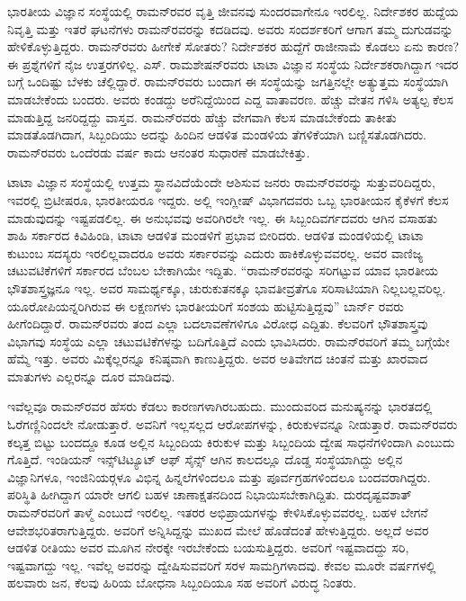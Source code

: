 ಭಾರತೀಯ ವಿಜ್ಞಾನ ಸಂಸ್ಥೆಯಲ್ಲಿ ರಾಮನ್‍ರವರ ವೃತ್ತಿ ಜೀವನವು ಸುಂದರವಾಗೇನೂ ಇರಲಿಲ್ಲ. ನಿರ್ದೇಶಕರ ಹುದ್ದೆಯ ನಿವೃತ್ತಿ ಮತ್ತು ಇತರೆ ಘಟನೆಗಳು ರಾಮನ್‍ರವರನ್ನು ಕದಡಿದವು. ಅವರು ಸಂದರ್ಶಕರಿಗೆ ಆಗಾಗ ತಮ್ಮ ದುಗುಡವನ್ನು ಹೇಳಿಕೊಳ್ಳುತ್ತಿದ್ದರು. ರಾಮನ್‍ರವರು ಹೀಗೇಕೆ ಸೋತರು? ನಿರ್ದೇಶಕರ ಹುದ್ದೆಗೆ ರಾಜೀನಾಮೆ ಕೊಡಲು ಏನು ಕಾರಣ? ಈ ಪ್ರಶ್ನೆಗಳಿಗೆ ನೈಜ ಉತ್ತರಗಳಿಲ್ಲ. ಎಸ್. ರಾಮಶೇಷನ್‍ರವರು ಟಾಟಾ ವಿಜ್ಞಾನ ಸಂಸ್ಥೆಯ ನಿರ್ದೇಶಕರಾಗಿದ್ದಾಗ ಇದರ ಬಗ್ಗೆ ಒಂದಿಷ್ಟು ಬೆಳಕು ಚೆಲ್ಲಿದ್ದಾರೆ. ರಾಮನ್‍ರವರು ಬಂದಾಗ ಈ ಸಂಸ್ಥೆಯನ್ನು ಜಗತ್ತಿನಲ್ಲೇ ಅತ್ಯುತ್ತಮ ಸಂಸ್ಥೆಯಾಗಿ ಮಾಡಬೇಕೆಂದು ಬಂದರು. ಅವರು ಕಂಡದ್ದು ಅರೆನಿದ್ದೆಯಿಂದ ಎದ್ದ ವಾತಾವರಣ. ಹೆಚ್ಚು ವೇತನ ಗಳಿಸಿ ಅತ್ಯಲ್ಪ ಕೆಲಸ ಮಾಡುತ್ತಿದ್ದ ಜನರಿದ್ದದ್ದು ವಾಸ್ತವ. ರಾಮನ್‍ರವರು ಹೆಚ್ಚು ವೇಗವಾಗಿ ಕೆಲಸ ಮಾಡಬೇಕೆಂದು ತಾಕೀತು ಮಾಡತೊಡಗಿದಾಗ, ಸಿಬ್ಬಂದಿಯು ಅದನ್ನು ಹಿಂದಿನ ಆಡಳಿತ ಮಂಡಳಿಯ ತೆಗಳಿಕೆಯಾಗಿ ಬಣ್ಣಿಸತೊಡಗಿದರು. ರಾಮನ್‍ರವರು ಒಂದೆರಡು ವರ್ಷ ಕಾದು ಆನಂತರ ಸುಧಾರಣೆ ಮಾಡಬೇಕಿತ್ತು.

ಟಾಟಾ ವಿಜ್ಞಾನ ಸಂಸ್ಥೆಯಲ್ಲಿ ಉತ್ತಮ ಸ್ಥಾನವಿದೆಯೆಂದೇ ಆಶಿಸುವ ಜನರು ರಾಮನ್‍ರವರನ್ನು ಸುತ್ತುವರಿದಿದ್ದರು, ಇವರಲ್ಲಿ ಬ್ರಿಟೀಷರೂ, ಭಾರತೀಯರೂ ಇದ್ದರು. ಅಲ್ಲಿ ಇಂಗ್ಲೀಷ್ ವಿಭಾಗದವರು ಒಬ್ಬ ಭಾರತೀಯನ ಕೈಕೆಳಗೆ ಕೆಲಸ ಮಾಡುವುದನ್ನು ಇಷ್ಟಪಡಲಿಲ್ಲ. ಈ ಅನುಭವವು ಅವರಿಗಿರಲೇ ಇಲ್ಲ. ಈ ಸಿಬ್ಬಂದಿವರ್ಗದವರು ಆಗಿನ ವಸಾಹತು ಶಾಹಿ ಸರ್ಕಾರದ ಕಿವಿಹಿಂಡಿ, ಟಾಟಾ ಆಡಳಿತ ಮಂಡಳಿಗೆ ಪ್ರಭಾವ ಬೀರಿದರು. ಆಡಳಿತ ಮಂಡಳಿಯಲ್ಲಿ ಟಾಟಾ ಕುಟುಂಬ ಸದಸ್ಯರು ಇರಲಿಲ್ಲವಾದರೂ ಅವರು ಸರ್ಕಾರವನ್ನು ಎದುರು ಹಾಕಿಕೊಳ್ಳುವವರಲ್ಲ. ಅವರ ವಾಣಿಜ್ಯ ಚಟುವಟಿಕೆಗಳಿಗೆ ಸರ್ಕಾರದ ಬೆಂಬಲ ಬೇಕಾಗಿಯೇ ಇದ್ದಿತು. “ರಾಮನ್‍ರವರನ್ನು ಸರಿಗಟ್ಟುವ ಯಾವ ಭಾರತೀಯ ಭೌತಶಾಸ್ತ್ರಜ್ಞನೂ ಇಲ್ಲ. ಅವರ ಸಾಮರ್ಥ್ಯಕ್ಕೂ, ಚುರುಕುತನಕ್ಕೂ ಭಾವತೀವ್ರತೆಗೂ ಸರಿಸಾಟಿಯಾಗಿ ನಿಲ್ಲಬಲ್ಲವರಿಲ್ಲ. ಯೂರೋಪಿಯನ್ನರಿಗಿರುವ ಈ ಲಕ್ಷಣಗಳು ಭಾರತೀಯರಿಗೆ ಸಂಶಯ ಹುಟ್ಟಿಸುತ್ತಿದ್ದವು” \enginline{-} ಬಾರ್ನ್ ರವರು ಹೀಗೆಂದಿದ್ದಾರೆ. ರಾಮನ್‍ರವರು ತಂದ ಎಲ್ಲಾ ಬದಲಾವಣೆಗಳಿಗೂ ವಿರೋಧ ಎದ್ದಿತು. ಕೆಲವರಿಗೆ ಭೌತಶಾಸ್ತ್ರವು ವಿಭಾಗವು ಸಂಸ್ಥೆಯ ಎಲ್ಲಾ ಚಟುವಟಿಕೆಗಳನ್ನು ಬದಿಗೊತ್ತಿದೆ ಎಂದು ಭಾವಿಸಿದರು. ರಾಮನ್‍ರವರಿಗೆ ತಮ್ಮ ಬಗ್ಗೆಯೇ ಹೆಮ್ಮೆ ಇತ್ತು. ಅವರು ಮಿಕ್ಕೆಲ್ಲರನ್ನೂ ಕನಿಷ್ಠವಾಗಿ ಕಾಣುತ್ತಿದ್ದರು. ಅವರ ಅತಿವೇಗದ ಚಿಂತನೆ ಮತ್ತು ಖಾರವಾದ ಮಾತುಗಳು ಎಲ್ಲರನ್ನೂ ದೂರ ಮಾಡಿದವು.

ಇವೆಲ್ಲವೂ ರಾಮನ್‍ರವರ ಹೆಸರು ಕೆಡಲು ಕಾರಣಗಳಾಗಿರಬಹುದು. ಮುಂದುವರಿದ ಮನುಷ್ಯನನ್ನು ಭಾರತದಲ್ಲಿ ಓರೆಗಣ್ಣಿನಿಂದಲೇ ನೋಡುತ್ತಾರೆ. ಅವನಿಗೆ ಇಲ್ಲಸಲ್ಲದ ಆರೋಪಗಳನ್ನು, ಕಿರುಕುಳವನ್ನೂ ನೀಡುತ್ತಾರೆ. ರಾಮನ್‍ರವರು ಕಲ್ಕತ್ತ ಬಿಟ್ಟು ಬಂದದ್ದೂ ಕೂಡ ಅಲ್ಲಿನ ಸಿಬ್ಬಂದಿಯ ಕಿರುಕುಳ ಮತ್ತು ಸಿಬ್ಬಂದಿಯ ದ್ವೇಷ ಸಾಧನೆಗಳಿಂದಾಗಿ ಎಂಬುದು ಗೊತ್ತಿದೆ. ಇಂಡಿಯನ್ ಇನ್ಸ್‌ಟಿಟ್ಯೂಟ್ ಆಫ್ ಸೈನ್ಸ್ ಆಗಿನ ಕಾಲದಲ್ಲೂ ದೊಡ್ಡ ಸಂಸ್ಥೆಯಾಗಿದ್ದು ಅಲ್ಲಿನ ವಿಜ್ಞಾನಿಗಳೂ, ಇಂಜಿನಿಯರ್‍ಗಳೂ ವಿಭಿನ್ನ ಹಿನ್ನಲೆಗಳಿಂದಲೂ ಮತ್ತು ಪೂರ್ವಗ್ರಹಗಳಿಂದಲೂ ಬಂದವರಾಗಿದ್ದರು. ಪರಿಸ್ಥಿತಿ ಹೀಗಿದ್ದಾಗ ಯಾರೇ ಆಗಲಿ ಬಹಳ ಚಾಣಾಕ್ಷತನದಿಂದ ನಿಭಾಯಿಸಬೇಕಾಗಿದ್ದಿತು. ದುರದೃಷ್ಟವಶಾತ್ ರಾಮನ್‍ರವರಿಗೆ ತಾಳ್ಮೆ ಎಂಬುದೆ ಇರಲಿಲ್ಲ. ಇತರರ ಅಭಿಪ್ರಾಯಗಳನ್ನು ಕೇಳಿಸಿಕೊಳ್ಳುವವರಲ್ಲ. ಬಹಳ ಬೇಗನೆ ಆವೇಶಭರಿತರಾಗುತ್ತಿದ್ದರು. ಅವರಿಗೆ ಅನ್ನಿಸಿದ್ದನ್ನು ಮುಖದ ಮೇಲೆ ಹೊಡೆದಂತೆ ಹೇಳುತ್ತಿದ್ದರು. ಅಲ್ಲದೆ ಅವರ ಆಡಳಿತ ರೀತಿಯು ಅವರ ಮೂಗಿನ ನೇರಕ್ಕೇ ಇರಬೇಕೆಂದು ಬಯಸುತ್ತಿದ್ದರು. ಅವರಿಗೆ ಇಷ್ಟವಾದದ್ದು ಸರಿ, ಇಷ್ಟವಾಗದ್ದು ಇಲ್ಲ. ಇವೆಲ್ಲ ಅವರನ್ನು ದ್ವೇಷಿಸುವವರಿಗೆ ಸರಳ ಸಾಮಗ್ರಿಗಳಾದವು. ಕೇವಲ ಮೂರೇ ವರ್ಷಗಳಲ್ಲಿ ಹಲವಾರು ಜನ, ಕೆಲವು ಹಿರಿಯ ಬೋಧನಾ ಸಿಬ್ಬಂದಿಯೂ ಸಹ ಅವರಿಗೆ ವಿರುದ್ಧ ನಿಂತರು.

